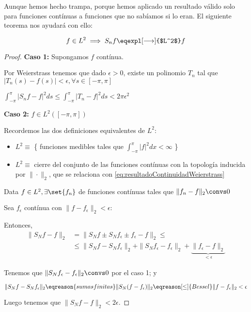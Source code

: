 		Aunque hemos hecho trampa, porque hemos aplicado un resultado válido solo para funciones contínuas a funciones que no sabíamos si lo eran. El siguiente teorema nos ayudará con ello:

		\begin{theorem} \label{thm:ConvergenciaL2Limite}

			\[ f \in L^2 \implies S_n f \eqexpl[\longrightarrow]{$L^2$} f \]

		\end{theorem}

		\begin{proof}

			\textbf{Caso 1:} Supongamos $f$ contínua.

			Por Weierstrass tenemos que dado $\epsilon > 0$, existe un polinomio $T_n$ tal que $|T_n(s) - f(s)| < \epsilon, \forall s \in [-\pi,\pi]$

			\(
				\int^{\pi}_{-\pi} | S_n f - f |^2 ds \leq \int^\pi_{-\pi} | T_n - f |^2 ds < 2 \pi \epsilon^2 \label{eq:resultadoContinuidadWeierstrass}
			\)

			\textbf{Caso 2:} $f \in L^2 ([-\pi,\pi])$

			Recordemos las dos definiciones equivalentes de $L^2$:
			\begin{itemize}

				\item $L^2 \equiv$ \{ funciones medibles tales que $\displaystyle \int^\pi_{-\pi} |f|^2 dx < \infty $ \}

				\item $L^2 \equiv$ cierre del conjunto de las funciones contínuas con la topología inducida por $\|\cdot\|_2$, que se relaciona con \ref{eq:resultadoContinuidadWeierstrass}

			\end{itemize}

			Data $f\in L^2, \exists \set{f_n}$ de funciones contínuas tales que $\|f_n - f\|_2 \convs 0$

			Sea $f_\epsilon$ contínua con $\|f-f_\epsilon\|_2 < \epsilon$:

			Entonces,
			\begin{align*}
			\| S_N f - f \|_2 &= \| S_N f \pm S_N f_\epsilon \pm f_\epsilon - f \|_2 \leq \\
			& \leq \| S_N f - S_N f_\epsilon \|_2 + \| S_N f_\epsilon - f_\epsilon \|_2 + \underbrace{\| f_\epsilon - f \|_2}_{< \epsilon}
			\end{align*}

			Tenemos que $\| S_N f_\epsilon - f_\epsilon \|_2 \convs 0$ por el caso 1; y

			\[ \| S_N f - S_N f_\epsilon \|_2 \eqreason{sumas finitas} \| S_N (f - f_\epsilon) \|_2 \eqreason[\leq]{Bessel} \| f - f_\epsilon \|_2 < \epsilon \]

			Luego tenemos que $\| S_N f - f \|_2 < 2\epsilon$.

		\end{proof}

